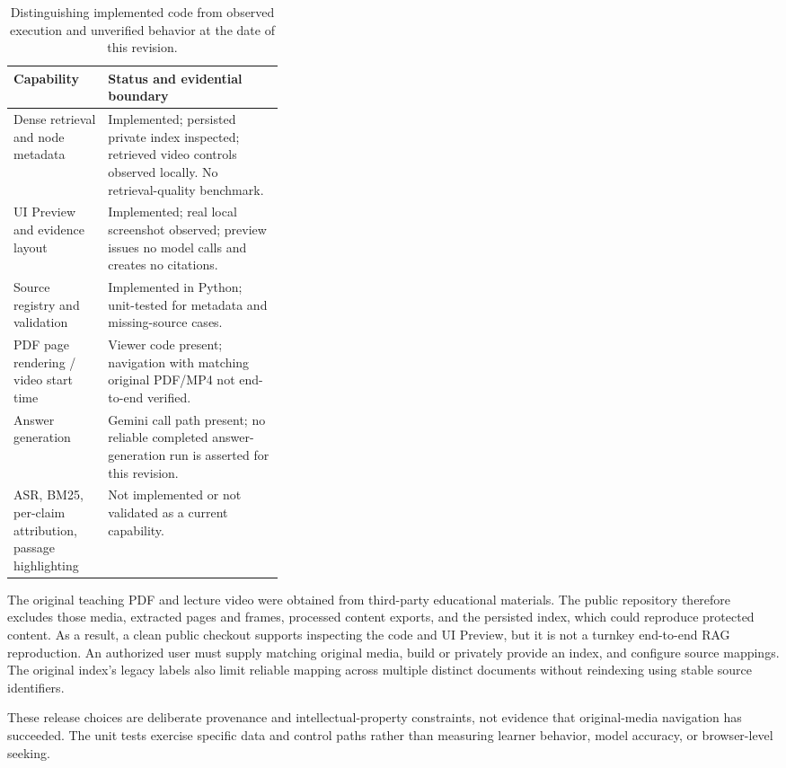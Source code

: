 \documentclass[manuscript,screen,nonacm]{acmart}
\begin{document}
\begin{table}[t]
\caption{Distinguishing implemented code from observed execution and unverified behavior at the date of this revision.}
\label{tab:status}
\small
\begin{tabularx}{\linewidth}{@{}>{\raggedright\arraybackslash}p{0.35\linewidth}X@{}}
\toprule
Capability & Status and evidential boundary \\
\midrule
Dense retrieval and node metadata & Implemented; persisted private index inspected; retrieved video controls observed locally. No retrieval-quality benchmark. \\
UI Preview and evidence layout & Implemented; real local screenshot observed; preview issues no model calls and creates no citations. \\
Source registry and validation & Implemented in Python; unit-tested for metadata and missing-source cases. \\
PDF page rendering / video start time & Viewer code present; navigation with matching original PDF/MP4 not end-to-end verified. \\
Answer generation & Gemini call path present; no reliable completed answer-generation run is asserted for this revision. \\
ASR, BM25, per-claim attribution, passage highlighting & Not implemented or not validated as a current capability. \\
\bottomrule
\end{tabularx}
\end{table}

The original teaching PDF and lecture video were obtained from third-party educational materials. The public repository therefore excludes those media, extracted pages and frames, processed content exports, and the persisted index, which could reproduce protected content. As a result, a clean public checkout supports inspecting the code and UI Preview, but it is not a turnkey end-to-end RAG reproduction. An authorized user must supply matching original media, build or privately provide an index, and configure source mappings. The original index's legacy labels also limit reliable mapping across multiple distinct documents without reindexing using stable source identifiers.

These release choices are deliberate provenance and intellectual-property constraints, not evidence that original-media navigation has succeeded. The unit tests exercise specific data and control paths rather than measuring learner behavior, model accuracy, or browser-level seeking.
\end{document}
